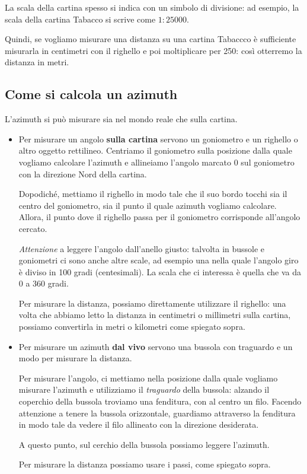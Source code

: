 \documentclass[12pt]{article}
\begin{document}
La scala della cartina spesso si indica con un simbolo di divisione: ad esempio, la scala della cartina Tabacco si scrive come \(1 : \num{25000}\). 

Quindi, se vogliamo misurare una distanza su una cartina Tabaccco è sufficiente misurarla in centimetri con il righello e poi moltiplicare per 250: così otterremo la distanza in metri. 

\subsection*{Come si calcola un azimuth}

L'azimuth si può misurare sia nel mondo reale che sulla cartina. 

\begin{itemize}[label=$-$]
  \item Per misurare un angolo \textbf{sulla cartina} servono un goniometro e un righello o altro oggetto rettilineo. Centriamo il goniometro sulla posizione dalla quale vogliamo calcolare l'azimuth e allineiamo l'angolo marcato 0 sul goniometro con la direzione Nord della cartina. 
  
  Dopodiché, mettiamo il righello in modo tale che il suo bordo tocchi sia il centro del goniometro, sia il punto il quale azimuth vogliamo calcolare. Allora, il punto dove il righello passa per il goniometro corrisponde all'angolo cercato.
  
  \emph{Attenzione} a leggere l'angolo dall'anello giusto: talvolta in bussole e goniometri ci sono anche altre scale, ad esempio una nella quale l'angolo giro è diviso in 100 gradi (centesimali). La scala che ci interessa è quella che va da 0 a 360 gradi. 

  Per misurare la distanza, possiamo direttamente utilizzare il righello: una volta che abbiamo letto la distanza in centimetri o millimetri sulla cartina, possiamo convertirla in metri o kilometri come spiegato sopra.  
  \item Per misurare un azimuth \textbf{dal vivo} servono una bussola con traguardo e un modo per misurare la distanza. 
  
  Per misurare l'angolo, ci mettiamo nella posizione dalla quale vogliamo misurare l'azimuth e utilizziamo il \emph{traguardo} della bussola: alzando il coperchio della bussola troviamo una fenditura, con al centro un filo. 
  Facendo attenzione a tenere la bussola orizzontale, guardiamo attraverso la fenditura in modo tale da vedere il filo allineato con la direzione desiderata. 

  A questo punto, sul cerchio della bussola possiamo leggere l'azimuth. 

  Per misurare la distanza possiamo usare i passi, come spiegato sopra. 
\end{itemize}
\end{document}
